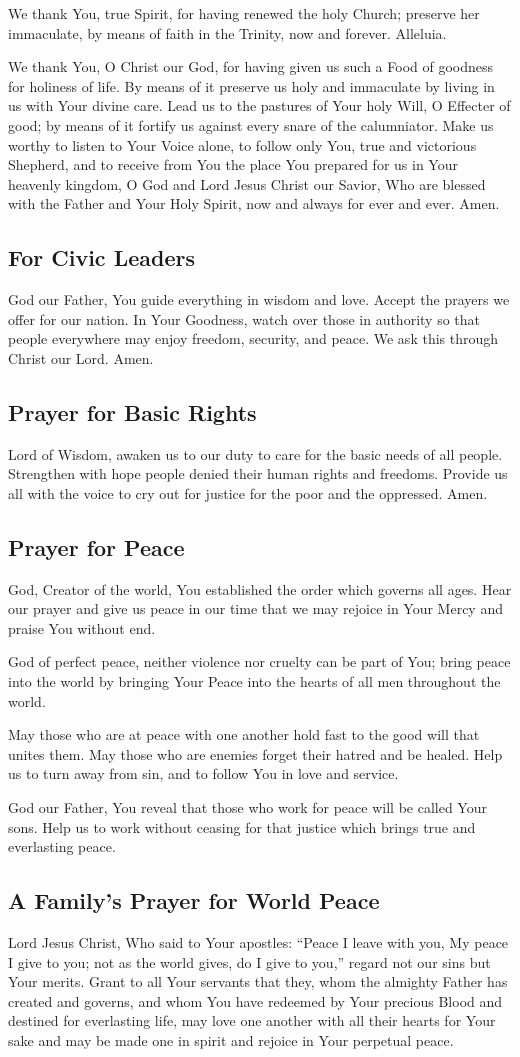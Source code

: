\documentclass[12pt]{article}
\newcommand{\prayertitle}[1]{\subsection{#1}}
\begin{document}
We thank You, true Spirit, for having renewed the holy Church; preserve her immaculate, by means of faith in the Trinity, now and forever. Alleluia.

We thank You, O Christ our God, for having given us such a Food of goodness for
holiness of life.
By means of it preserve us holy and immaculate by living in us with Your divine care.
Lead us to the pastures of Your holy Will, O Effecter of good; by means of it fortify us against every snare of the calumniator.
Make us worthy to listen to Your Voice alone, to follow only You, true and victorious Shepherd, and to receive from You the place You prepared for us in Your heavenly kingdom, O God and Lord Jesus Christ our Savior, Who are blessed with the Father and Your Holy Spirit, now and always for ever and ever.
Amen.

\prayertitle{For Civic Leaders}
\label{prayer:civic-leaders}
God our Father, You guide everything in wisdom and love.
Accept the prayers we offer for our nation.
In Your Goodness, watch over those in authority so that people everywhere may enjoy freedom, security, and peace.
We ask this through Christ our Lord.
Amen.

\prayertitle{Prayer for Basic Rights}
\label{prayer:basic-rights}
Lord of Wisdom, awaken us to our duty to care for the basic needs of all people.
Strengthen with hope people denied their human rights and freedoms.
Provide us all with the voice to cry out for justice for the poor and the oppressed.
Amen.

\prayertitle{Prayer for Peace}
God, Creator of the world, You established the order which governs all ages.
Hear our prayer and give us peace in our time that we may rejoice in Your Mercy and praise You without end.

God of perfect peace, neither violence nor cruelty can be part of You;
bring peace into the world by bringing Your Peace into the hearts of all men throughout the world.

May those who are at peace with one another hold fast to the good will that unites them.
May those who are enemies forget their hatred and be healed.
Help us to turn away from sin, and to follow You in love and service.

God our Father, You reveal that those who work for peace will be called Your sons.
Help us to work without ceasing for that justice which brings true and everlasting peace.

\prayertitle{A Family's Prayer for World Peace}
Lord Jesus Christ, Who said to Your apostles:
``Peace I leave with you, My peace I give to you;
not as the world gives, do I give to you,''
regard not our sins but Your merits.
Grant to all Your servants that they, whom the almighty Father has created and governs, and whom You have redeemed by Your precious Blood and destined for everlasting life, may love one another with all their hearts for Your sake and may be made one in spirit and rejoice in Your perpetual peace.
\end{document}
